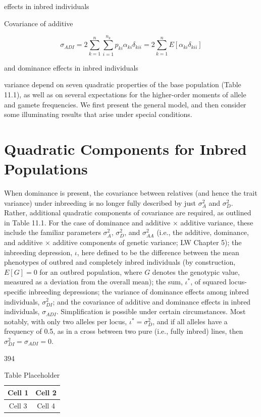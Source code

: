 \documentclass{article}
\begin{document}
effects in inbred individuals

Covariance of additive

\begin{equation}
\sigma_{ADI}=2\sum_{k=1}^{n}\sum_{i=1}^{n_{k}}p_{ki}\alpha_{ki}\delta_{kii}=2\sum_{k=1}^{n}E[\alpha_{ki}\delta_{kii}]
\end{equation}

and dominance effects in inbred individuals

variance depend on seven quadratic properties of the base population (Table 11.1), as well as on several expectations for the higher-order moments of allele and gamete frequencies. We first present the general model, and then consider some illuminating results that arise under special conditions.

\section{Quadratic Components for Inbred Populations}
When dominance is present, the covariance between relatives (and hence the trait variance) under inbreeding is no longer fully described by just  $ \sigma_A^2 $ and  $ \sigma_D^2 $. Rather, additional quadratic components of covariance are required, as outlined in Table 11.1. For the case of dominance and additive × additive variance, these include the familiar parameters  $ \sigma_A^2 $,  $ \sigma_D^2 $, and  $ \sigma_{AA}^2 $ (i.e., the additive, dominance, and additive × additive components of genetic variance; LW Chapter 5); the inbreeding depression,  $ \iota $, here defined to be the difference between the mean phenotypes of outbred and completely inbred individuals (by construction,  $ E[G] = 0 $ for an outbred population, where  $ G $ denotes the genotypic value, measured as a deviation from the overall mean); the sum,  $ \iota^* $, of squared locus-specific inbreeding depressions; the variance of dominance effects among inbred individuals,  $ \sigma_{DI}^2 $; and the covariance of additive and dominance effects in inbred individuals,  $ \sigma_{ADI} $. Simplification is possible under certain circumstances. Most notably, with only two alleles per locus,  $ \iota^* = \sigma_D^2 $, and if all alleles have a frequency of 0.5, as in a cross between two pure (i.e., fully inbred) lines, then  $ \sigma_{DI}^2 = \sigma_{ADI} = 0 $.

394

\begin{table}[h]
\centering
\begin{tabular}{|c|c|}
\hline
Cell 1 & Cell 2 \\
\hline
Cell 3 & Cell 4 \\
\hline
\end{tabular}
\caption{Table Placeholder}
\end{table}
\end{document}
